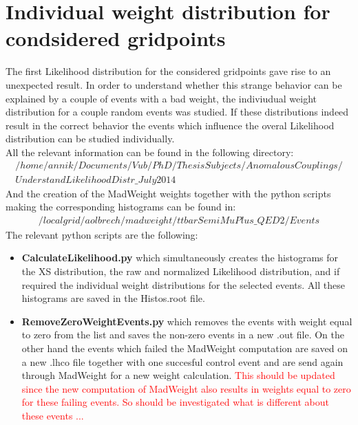 \documentclass[a4paper,12pt]{report}
\begin{document}
\section{Individual weight distribution for condsidered gridpoints}
The first Likelihood distribution for the considered gridpoints gave rise to an unexpected result. In order to understand whether this strange behavior can be explained by a couple of events with a bad weight, the indiviudual weight distribution for a couple random events was studied. If these distributions indeed result in the correct behavior the events which influence the overal Likelihood distribution can be studied individually.\\
All the relevant information can be found in the following directory:
\begin{eqnarray*}
 /home/annik/Documents/Vub/PhD/ThesisSubjects/AnomalousCouplings/ \\ UnderstandLikelihoodDistr\_July2014
\end{eqnarray*}
And the creation of the MadWeight weights together with the python scripts making the corresponding histograms can be found in:
\begin{eqnarray*}
 /localgrid/aolbrech/madweight/ttbarSemiMuPlus\_QED2/Events
\end{eqnarray*}
The relevant python scripts are the following:
\begin{itemize}
 \item \textbf{CalculateLikelihood.py} which simultaneously creates the histograms for the XS distribution, the raw and normalized Likelihood distribution, and if required the individual weight distributions for the selected events. All these histograms are saved in the Histos.root file.
 \item \textbf{RemoveZeroWeightEvents.py} which removes the events with weight equal to zero from the list and saves the non-zero events in a new .out file. On the other hand the events which failed the MadWeight computation are saved on a new .lhco file together with one succesful control event and are send again through MadWeight for a new weight calculation. \textcolor{red}{This should be updated since the new computation of MadWeight also results in weights equal to zero for these failing events. So should be investigated what is different about these events ...}
\end{itemize}
\end{document}
